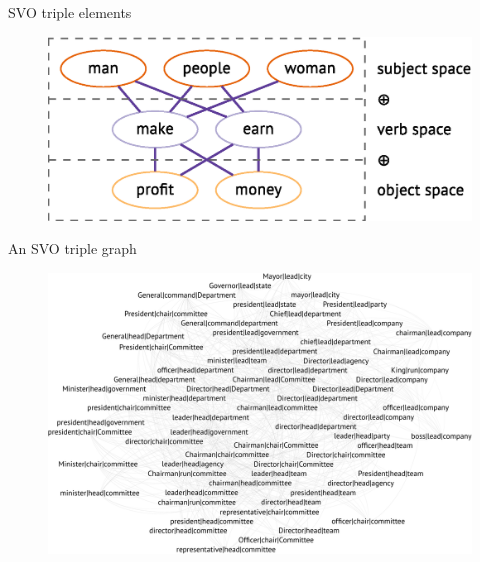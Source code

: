\begin{frame}{SVO triple elements}


\begin{figure}
  \centering
  \includegraphics[width=\columnwidth]{figures/triples}
\end{figure}
	
\end{frame}




\begin{frame}{An SVO triple graph}

\vspace{-1em}\begin{figure}
  \centering
  \includegraphics[width=.9\textwidth]{figures/lead}
  
\end{figure}
	
\end{frame}



